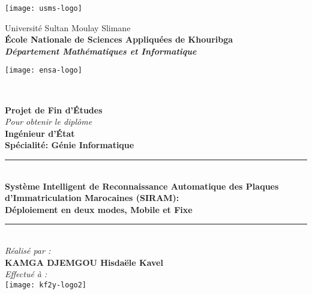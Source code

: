 \begin{titlepage}
\begin{minipage}{2cm}
	\begin{flushleft}
		\texttt{[image: usms-logo]}
	\end{flushleft}
\end{minipage}\hfill
\begin{minipage}{12cm}
	\begin{center}
		Université Sultan Moulay Slimane\\
		\textbf{École Nationale de Sciences Appliquées de Khouribga}\\
		\textit{\textbf{Département Mathématiques et Informatique}}
	\end{center}
\end{minipage}\hfill
\begin{minipage}{2cm}
	\begin{flushright}
		\texttt{[image: ensa-logo]}
	\end{flushright}
\end{minipage}\\

\begin{center}

{\Huge \bfseries Projet de Fin d’Études}\\[0.5cm]
\textit{Pour obtenir le diplôme}\\
{\LARGE \textbf{Ingénieur d'État}}\\[0.5cm]
{\Large \bfseries{Spécialité: Génie Informatique} \\ }

\vfill
\rule{0.95\textwidth}{2pt}\\
	\Large \textbf{Système Intelligent de Reconnaissance Automatique des Plaques d'Immatriculation Marocaines (SIRAM):}\\
	\textbf{Déploiement en deux modes, Mobile et Fixe}
\rule{0.95\textwidth}{2pt}\\

\vfill
\emph{Réalisé par :}\\[0.5cm]
\Large \textbf{\textsc{KAMGA DJEMGOU} Hisdaële Kavel}\\

\vfill
\emph{Effectué à :}\\[0.5cm]
\texttt{[image: kf2y-logo2]}
\end{center}


\end{titlepage}
